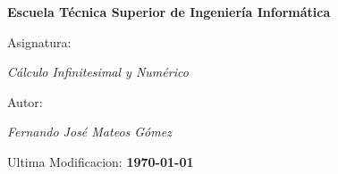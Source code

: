 \begin{titlepage}
        \centering
        {\bfseries\LARGE Escuela Técnica Superior de Ingeniería Informática\par}
        \vspace{1cm}
        {\Large Asignatura: \par \textit{Cálculo Infinitesimal y Numérico} \par}
        \vspace{1cm}
        {\Large Autor: \par \textit{Fernando José Mateos Gómez} \par}
        \vspace{2cm}
        {\Large Ultima Modificacion: \textbf{\today} \par}
        \vspace{2cm}
\end{titlepage}
\restoregeometry